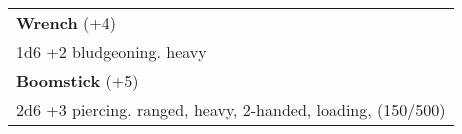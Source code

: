 \documentclass[twocolumn]{article}
\begin{document}
%

\vspace{40pt}

\\
\noindent\begin{tabular}{|m{3.1in}|}
\hline
\textbf{Wrench} (+4) \\
1d6 +2 bludgeoning. heavy\\
\textbf{Boomstick} (+5) \\
2d6 +3 piercing. ranged, heavy, 2-handed, loading, (150/500)\\

\hline
\end{tabular}
\vspace{8pt}
\end{document}
